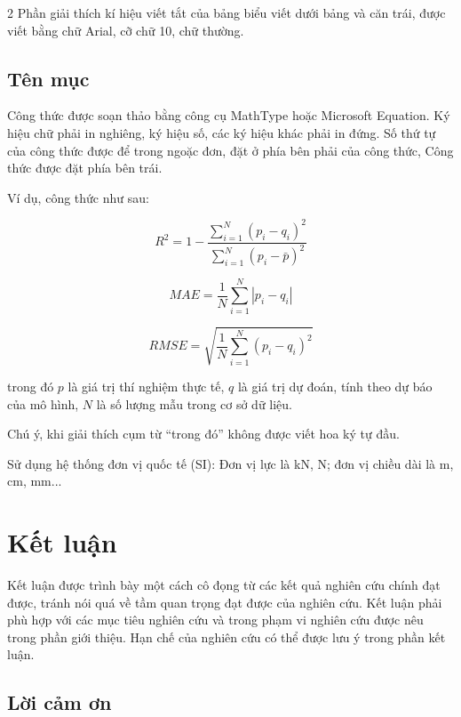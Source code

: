 \documentclass[10pt]{article}
\begin{document}
\begin{multicols}{2}
Phần giải thích kí hiệu viết tắt của bảng biểu viết dưới bảng và căn
trái, được viết bằng chữ Arial, cỡ chữ 10, chữ thường.

\subsection{Tên mục}

Công thức được soạn thảo bằng công cụ MathType hoặc Microsoft
Equation. Ký hiệu chữ phải in nghiêng, ký hiệu số, các ký hiệu khác
phải in đứng. Số thứ tự của công thức được để trong ngoặc đơn, đặt ở
phía bên phải của công thức, Công thức được đặt phía bên trái.

Ví dụ, công thức như sau:

\begin{equation}
R^2 = 1-\dfrac{\sum_{i=1}^{N}(p_i-q_i)^2}{\sum_{i=1}^{N}(p_i-\bar{p})^2}
\end{equation}

\begin{equation}
MAE = \dfrac{1}{N}\sum_{i=1}^{N}\left| p_i-q_i \right|
\end{equation}

\begin{equation}
RMSE = \sqrt{\dfrac{1}{N}\sum_{i=1}^{N}(p_i-q_i)^2}
\end{equation}

trong đó $p$ là giá trị thí nghiệm thực tế, $q$ là giá trị dự đoán,
tính theo dự báo của mô hình, $N$ là số lượng mẫu trong cơ sở dữ liệu.

Chú ý, khi giải thích cụm từ ``trong đó'' không được viết hoa ký tự
đầu.

Sử dụng hệ thống đơn vị quốc tế (SI): Đơn vị lực là kN, N; đơn vị
chiều dài là m, cm, mm...

\section{Kết luận}

Kết luận được trình bày một cách cô đọng từ các kết quả nghiên cứu
chính đạt được, tránh nói quá về tầm quan trọng đạt được của nghiên
cứu. Kết luận phải phù hợp với các mục tiêu nghiên cứu và trong phạm
vi nghiên cứu được nêu trong phần giới thiệu. Hạn chế của nghiên cứu
có thể được lưu ý trong phần kết luận.

\subsection*{Lời cảm ơn}


\end{multicols}
\end{document}
